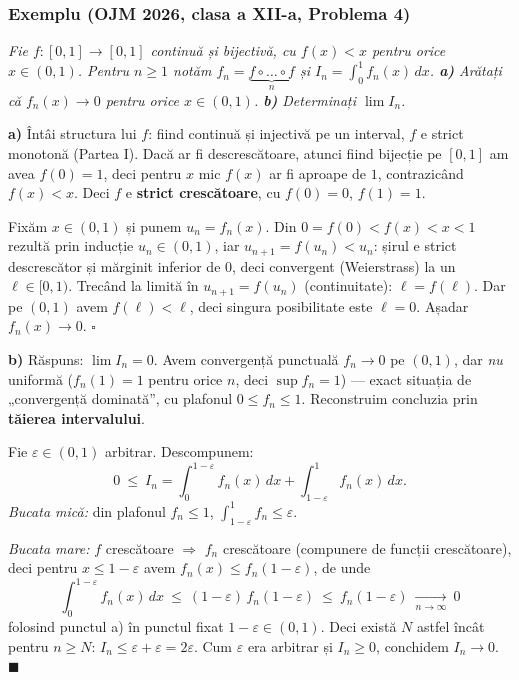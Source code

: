 \subsubsection*{Exemplu (OJM 2026, clasa a XII-a, Problema 4)}

\emph{Fie $f:[0,1]\to[0,1]$ continuă și bijectivă, cu $f(x)<x$ pentru orice $x\in(0,1)$. Pentru $n\ge1$ notăm $f_n=\underbrace{f\circ\dots\circ f}_{n}$ și $I_n=\int_0^1f_n(x)\,dx$. \textbf{a)} Arătați că $f_n(x)\to0$ pentru orice $x\in(0,1)$. \textbf{b)} Determinați $\lim I_n$.}

\medskip
\textbf{a)} Întâi structura lui $f$: fiind continuă și injectivă pe un interval, $f$ e strict monotonă (Partea I). Dacă ar fi descrescătoare, atunci fiind bijecție pe $[0,1]$ am avea $f(0)=1$, deci pentru $x$ mic $f(x)$ ar fi aproape de $1$, contrazicând $f(x)<x$. Deci $f$ e \textbf{strict crescătoare}, cu $f(0)=0$, $f(1)=1$.

Fixăm $x\in(0,1)$ și punem $u_n=f_n(x)$. Din $0=f(0)<f(x)<x<1$ rezultă prin inducție $u_n\in(0,1)$, iar $u_{n+1}=f(u_n)<u_n$: șirul e strict descrescător și mărginit inferior de $0$, deci convergent (Weierstrass) la un $\ell\in[0,1)$. Trecând la limită în $u_{n+1}=f(u_n)$ (continuitate): $\ell=f(\ell)$. Dar pe $(0,1)$ avem $f(\ell)<\ell$, deci singura posibilitate este $\ell=0$. Așadar $f_n(x)\to0$. \hfill$\square$

\textbf{b)} Răspuns: $\lim I_n=0$. Avem convergență punctuală $f_n\to0$ pe $(0,1)$, dar \emph{nu} uniformă ($f_n(1)=1$ pentru orice $n$, deci $\sup f_n=1$) --- exact situația de „convergență dominată'', cu plafonul $0\le f_n\le1$. Reconstruim concluzia prin \textbf{tăierea intervalului}.

Fie $\varepsilon\in(0,1)$ arbitrar. Descompunem:
\[
0\ \le\ I_n=\int_0^{1-\varepsilon}f_n(x)\,dx+\int_{1-\varepsilon}^{1}f_n(x)\,dx.
\]
\emph{Bucata mică:} din plafonul $f_n\le1$, $\displaystyle\int_{1-\varepsilon}^1f_n\le\varepsilon$.

\emph{Bucata mare:} $f$ crescătoare $\Rightarrow$ $f_n$ crescătoare (compunere de funcții crescătoare), deci pentru $x\le1-\varepsilon$ avem $f_n(x)\le f_n(1-\varepsilon)$, de unde
\[
\int_0^{1-\varepsilon}f_n(x)\,dx\ \le\ (1-\varepsilon)\,f_n(1-\varepsilon)\ \le\ f_n(1-\varepsilon)\ \xrightarrow[n\to\infty]{}\ 0
\]
folosind punctul a) în punctul fixat $1-\varepsilon\in(0,1)$. Deci există $N$ astfel încât pentru $n\ge N$: $I_n\le\varepsilon+\varepsilon=2\varepsilon$. Cum $\varepsilon$ era arbitrar și $I_n\ge0$, conchidem $I_n\to0$. \hfill$\blacksquare$

